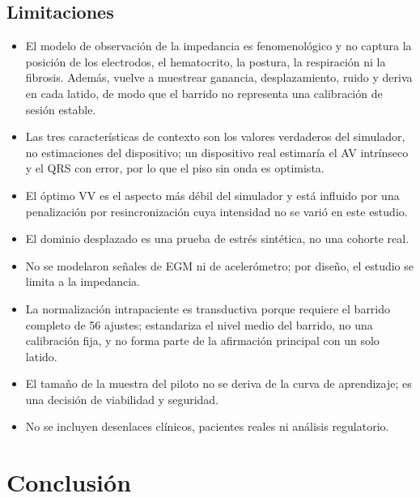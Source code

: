 \documentclass[11pt,a4paper]{article}
\begin{document}
\subsection{Limitaciones}

\begin{itemize}[leftmargin=1.5em,itemsep=0.2em]
  \item El modelo de observación de la impedancia es fenomenológico y no captura
        la posición de los electrodos, el hematocrito, la postura, la respiración
        ni la fibrosis. Además, vuelve a muestrear ganancia, desplazamiento,
        ruido y deriva en cada latido, de modo que el barrido no representa una
        calibración de sesión estable.
  \item Las tres características de contexto son los valores verdaderos del
        simulador, no estimaciones del dispositivo; un dispositivo real
        estimaría el AV intrínseco y el QRS con error, por lo que el piso sin
        onda es optimista.
  \item El óptimo VV es el aspecto más débil del simulador y está influido por
        una penalización por resincronización cuya intensidad no se varió en este
        estudio.
  \item El dominio desplazado es una prueba de estrés sintética, no una cohorte
        real.
  \item No se modelaron señales de EGM ni de acelerómetro; por diseño, el estudio
        se limita a la impedancia.
  \item La normalización intrapaciente es transductiva porque requiere el barrido
        completo de 56 ajustes; estandariza el nivel medio del barrido, no una
        calibración fija, y no forma parte de la afirmación principal con un solo
        latido.
  \item El tamaño de la muestra del piloto no se deriva de la curva de
        aprendizaje; es una decisión de viabilidad y seguridad.
  \item No se incluyen desenlaces clínicos, pacientes reales ni análisis
        regulatorio.
\end{itemize}

\section{Conclusión}
\end{document}
